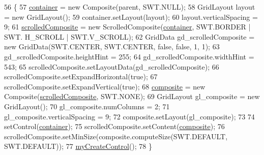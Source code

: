 \begin{DoxyCode}
56                                                 \{
57         \hyperlink{classit_1_1isislab_1_1masonhelperdocumentation_1_1mason_1_1wizards_1_1_h___environment_page_ae24bc5d12a792cdda1cba4f0b66f1c4c}{container} = \textcolor{keyword}{new} Composite(parent, SWT.NULL);
58         GridLayout layout = \textcolor{keyword}{new} GridLayout();
59         container.setLayout(layout);
60         layout.verticalSpacing = 9;     
61         \hyperlink{classit_1_1isislab_1_1masonhelperdocumentation_1_1mason_1_1wizards_1_1_h___environment_page_aed460345526f7b8e93de92025dbff70f}{scrolledComposite} = \textcolor{keyword}{new} ScrolledComposite(\hyperlink{classit_1_1isislab_1_1masonhelperdocumentation_1_1mason_1_1wizards_1_1_h___environment_page_ae24bc5d12a792cdda1cba4f0b66f1c4c}{container}, SWT.BORDER | SWT.
      H\_SCROLL | SWT.V\_SCROLL);           
62         GridData gd\_scrolledComposite = \textcolor{keyword}{new} GridData(SWT.CENTER, SWT.CENTER, \textcolor{keyword}{false}, \textcolor{keyword}{false}, 1, 1);
63         gd\_scrolledComposite.heightHint = 255;
64         gd\_scrolledComposite.widthHint = 543;
65         scrolledComposite.setLayoutData(gd\_scrolledComposite);
66         scrolledComposite.setExpandHorizontal(\textcolor{keyword}{true});
67         scrolledComposite.setExpandVertical(\textcolor{keyword}{true});      
68         \hyperlink{classit_1_1isislab_1_1masonhelperdocumentation_1_1mason_1_1wizards_1_1_h___environment_page_acd16b35445be03e0527a45d03cf61573}{composite} = \textcolor{keyword}{new} Composite(\hyperlink{classit_1_1isislab_1_1masonhelperdocumentation_1_1mason_1_1wizards_1_1_h___environment_page_aed460345526f7b8e93de92025dbff70f}{scrolledComposite}, SWT.NONE);
69         GridLayout gl\_composite = \textcolor{keyword}{new} GridLayout();
70         gl\_composite.numColumns = 2;
71         gl\_composite.verticalSpacing = 9;
72         composite.setLayout(gl\_composite);
73         
74         setControl(\hyperlink{classit_1_1isislab_1_1masonhelperdocumentation_1_1mason_1_1wizards_1_1_h___environment_page_ae24bc5d12a792cdda1cba4f0b66f1c4c}{container});
75         scrolledComposite.setContent(\hyperlink{classit_1_1isislab_1_1masonhelperdocumentation_1_1mason_1_1wizards_1_1_h___environment_page_acd16b35445be03e0527a45d03cf61573}{composite});
76         scrolledComposite.setMinSize(composite.computeSize(SWT.DEFAULT, SWT.DEFAULT));  
77         \hyperlink{classit_1_1isislab_1_1masonhelperdocumentation_1_1mason_1_1wizards_1_1_h___environment_page_a09a8404f1e96b68ec8bcb29a3da65558}{myCreateControl}();
78     \}
\end{DoxyCode}



